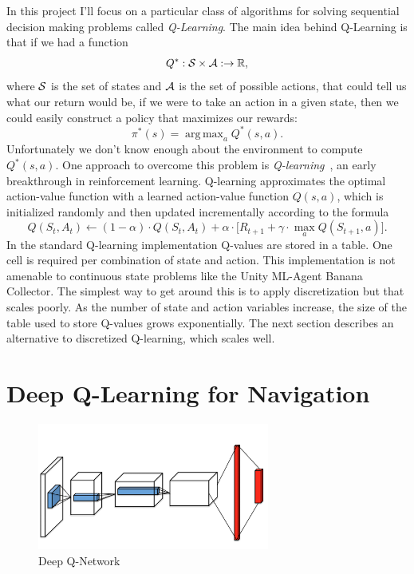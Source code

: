 \documentclass[tog]{acmsiggraph}
\begin{document}
In this project I'll focus on a particular class of algorithms for 
solving sequential decision making problems called {\em Q-Learning}. The main idea behind Q-Learning is that if we had a function 
$$Q^*:{\cal S} \times {\cal A}:\to\mathbb{R},$$
where ${\cal S}$ is the set of states and ${\cal A}$ is the set of possible actions, that could tell us what our return would be, if we were to take an action in a given state, then we could easily construct a policy that maximizes our rewards:
$$\pi^*(s) = \operatorname{arg\,max}_{a} Q^*(s,a).$$
Unfortunately we don't know enough about the environment to compute $Q^*(s,a)$. One approach to overcome this problem is 
{\em Q-learning}~\cite{DBLP:books/lib/WatkinsC1989}, 
an early breakthrough in reinforcement learning.   Q-learning approximates the optimal action-value function with a learned action-value function $Q(s,a)$, which 
is initialized randomly and then updated incrementally according to the formula
$$Q(S_t,A_t) \leftarrow (1-\alpha)\cdot Q(S_t,A_t) + \alpha \cdot \big[R_{t+1}+\gamma \cdot \max_a Q(S_{t+1},a)\big].$$
In the standard Q-learning implementation Q-values are stored in a table.
One cell is required per combination of state and action. This implementation
is not amenable to continuous state problems like the Unity ML-Agent Banana Collector.
The simplest way to get around this is to apply discretization but that scales poorly. As the number of
state and action variables increase, the size of the table used to store Q-values
grows exponentially. The next section describes an alternative to discretized Q-learning, which scales well.

\section{ Deep Q-Learning for Navigation}

\begin{figure}[h]
	\centering
	\includegraphics[width=3.0in]{images/dqn}
	\caption{Deep Q-Network~\protect\cite{DBLP:journals/corr/WangFL15}}
	\label{fig:dqn}
\end{figure}
\end{document}
